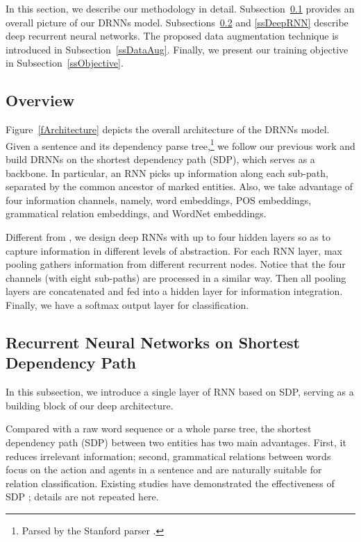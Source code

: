 \documentclass[11pt]{article}
\begin{document}
In this section, we describe our methodology in detail. Subsection~\ref{ssOverview} provides an overall picture of our DRNNs model. Subsections~\ref{ssRNN} and \ref{ssDeepRNN} describe deep recurrent neural networks. The proposed data augmentation technique is introduced in Subsection~\ref{ssDataAug}. Finally, we present our training objective in Subsection~\ref{ssObjective}.


\subsection{Overview}\label{ssOverview}

Figure~\ref{fArchitecture} depicts the overall architecture of the DRNNs model.
Given a sentence and its dependency parse tree,\footnote{
Parsed by the Stanford parser \cite{TypeDep}.} we follow our previous work \cite{SDP-LSTM} and build DRNNs on the shortest dependency path (SDP), which serves as a backbone. In particular, an RNN picks up information along each sub-path, separated by the common ancestor of marked entities. Also, we take advantage of four information channels, namely, word embeddings, POS embeddings, grammatical relation embeddings, and WordNet embeddings.


Different from , we design deep RNNs with up to four hidden layers so as to capture information in different levels of abstraction. For each RNN layer, max pooling gathers information from different recurrent nodes. Notice that the four channels (with eight sub-paths) are processed in a similar way. Then all pooling layers are concatenated and fed into a hidden layer for information integration. Finally, we have a softmax output layer for classification.

\subsection{Recurrent Neural Networks on Shortest Dependency Path}\label{ssRNN}
In this subsection, we introduce a single layer of RNN based on SDP, serving as a building block of our deep architecture.


Compared with a raw word sequence or a whole parse tree, the shortest dependency path (SDP) between two entities has two main advantages. First, it reduces irrelevant information; second, grammatical relations between words focus on the action and agents in a sentence and are naturally suitable for relation classification. Existing studies  have demonstrated the effectiveness of SDP \cite{chainRNN,DepNN,SDP-LSTM,CNN-NG}; details are not repeated here.
\end{document}
